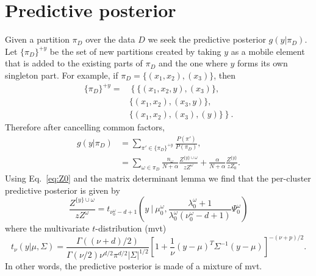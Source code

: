 \documentclass[11pt, oneside]{article}   	%
\begin{document}
\section{Predictive posterior}
Given a partition $\pi_D$ over the data $D$ we seek the predictive posterior $g(y\vert\pi_D)$. Let $\lbrace\pi_D\rbrace^{+y}$ be the set of new partitions created by taking $y$ as a mobile element that is added to the existing parts of $\pi_D$ and the one where $y$ forms its own singleton part. For example, if $\pi_D = \lbrace (x_1, x_2),(x_3)\rbrace$, then
\begin{equation}\begin{split}
\lbrace \pi_D\rbrace^{+y} =&\left\lbrace\lbrace (x_1, x_2, y),( x_3)\rbrace,\right.\\
&\left.\lbrace( x_1, x_2),( x_3, y)\rbrace,\right.\\
&\left.\lbrace (x_1, x_2),( x_3), ( y)\rbrace\right\rbrace.
\end{split}\end{equation}
Therefore after cancelling common factors,
\begin{equation}\begin{split}\label{eq:predpost}
g(y \vert\pi_D) &= \sum_{\pi'\in\lbrace\pi_D\rbrace^{+y}}\frac{P(\pi')}{P(\pi_D)},\\
&= \sum_{\omega\in\pi_D} \frac{n_\omega}{N + \alpha}\frac{Z^{\lbrace y\rbrace\cup\omega}}{z Z^\omega} + \frac{\alpha}{N + \alpha} \frac{Z^{\lbrace y\rbrace}}{z Z_0}.
\end{split}\end{equation}
Using Eq.~\ref{eq:Z0} and the matrix determinant lemma we find that the per-cluster predictive posterior is given by
$$\frac{Z^{\lbrace y\rbrace\cup\omega}}{z Z^\omega} = t_{\nu^{\omega}_0 - d + 1}\left(y~\vert~\mu_0^{\omega}, \frac{\lambda_0^\omega + 1}{\lambda_0^\omega(\nu_0^\omega - d + 1)} \Psi_0^\omega\right)$$
where the multivariate $t$-distribution (mvt)
$$ t_\nu(y\vert\mu,\Sigma) = \frac{\Gamma((\nu + d)/2)}{\Gamma(\nu/2)\nu^{d/2}\pi^{d/2}\vert\Sigma\vert^{1/2}}\left[1 + \frac{1}{\nu}(y - \mu)^T\Sigma^{-1}(y - \mu)\right]^{-(\nu + p)/2}.$$
In other words, the predictive posterior is made of a mixture of mvt. %
\end{document}

